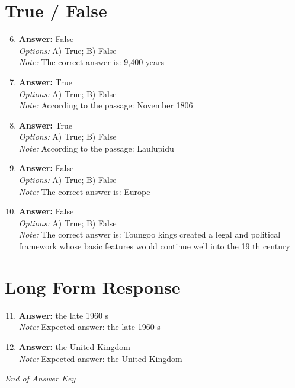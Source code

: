 \documentclass[12pt]{article}
\begin{document}
\section*{True / False}
\begin{enumerate}[label=\arabic*.]
\setcounter{enumi}{5}
\item \textbf{Answer:} False
\\ \textit{Options:} A) True; B) False
\\ \textit{Note:} The correct answer is: 9,400 years
\item \textbf{Answer:} True
\\ \textit{Options:} A) True; B) False
\\ \textit{Note:} According to the passage: November 1806
\item \textbf{Answer:} True
\\ \textit{Options:} A) True; B) False
\\ \textit{Note:} According to the passage: Laulupidu
\item \textbf{Answer:} False
\\ \textit{Options:} A) True; B) False
\\ \textit{Note:} The correct answer is: Europe
\item \textbf{Answer:} False
\\ \textit{Options:} A) True; B) False
\\ \textit{Note:} The correct answer is: Toungoo kings created a legal and political framework whose basic features would continue well into the 19 th century
\end{enumerate}

\section*{Long Form Response}
\begin{enumerate}[label=\arabic*.]
\setcounter{enumi}{10}
\item \textbf{Answer:} the late 1960 s
\\ \textit{Note:} Expected answer: the late 1960 s
\item \textbf{Answer:} the United Kingdom
\\ \textit{Note:} Expected answer: the United Kingdom
\end{enumerate}

\vfill
\noindent\textit{End of Answer Key}
\end{document}
